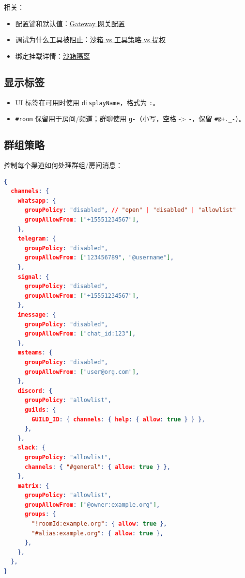 相关：

\begin{itemize}
  \item 配置键和默认值：\href{/gateway/configuration\#agentsdefaultssandbox}{Gateway 网关配置}
  \item 调试为什么工具被阻止：\href{/gateway/sandbox-vs-tool-policy-vs-elevated}{沙箱 vs 工具策略 vs 提权}
  \item 绑定挂载详情：\href{/gateway/sandboxing\#custom-bind-mounts}{沙箱隔离}
\end{itemize}


\subsection{显示标签}


\begin{itemize}
  \item UI 标签在可用时使用 \texttt{displayName}，格式为 \texttt{:}。
  \item \texttt{\#room} 保留用于房间/频道；群聊使用 \texttt{g-}（小写，空格 -> \texttt{-}，保留 \texttt{\#@+.\_-}）。
\end{itemize}


\subsection{群组策略}


控制每个渠道如何处理群组/房间消息：

\begin{lstlisting}[language=json]
{
  channels: {
    whatsapp: {
      groupPolicy: "disabled", // "open" | "disabled" | "allowlist"
      groupAllowFrom: ["+15551234567"],
    },
    telegram: {
      groupPolicy: "disabled",
      groupAllowFrom: ["123456789", "@username"],
    },
    signal: {
      groupPolicy: "disabled",
      groupAllowFrom: ["+15551234567"],
    },
    imessage: {
      groupPolicy: "disabled",
      groupAllowFrom: ["chat_id:123"],
    },
    msteams: {
      groupPolicy: "disabled",
      groupAllowFrom: ["user@org.com"],
    },
    discord: {
      groupPolicy: "allowlist",
      guilds: {
        GUILD_ID: { channels: { help: { allow: true } } },
      },
    },
    slack: {
      groupPolicy: "allowlist",
      channels: { "#general": { allow: true } },
    },
    matrix: {
      groupPolicy: "allowlist",
      groupAllowFrom: ["@owner:example.org"],
      groups: {
        "!roomId:example.org": { allow: true },
        "#alias:example.org": { allow: true },
      },
    },
  },
}
\end{lstlisting}



